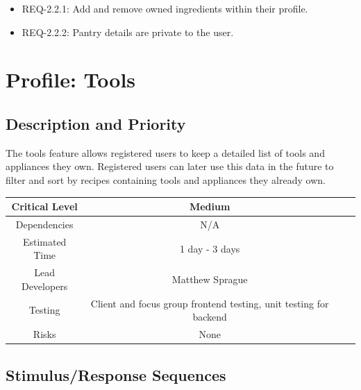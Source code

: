 \documentclass{scrreprt}
\begin{document}
\begin{itemize}
    \item REQ-2.2.1: Add and remove owned ingredients within their profile.
    \item REQ-2.2.2: Pantry details are private to the user.
\end{itemize}

\section{Profile: Tools}

\subsection{Description and Priority}

The tools feature allows registered users to keep a detailed list of tools and appliances they own. Registered users can later use this data in the future to filter and sort by recipes containing tools and appliances they already own.

\begin{center}
    \begin{tabular}{| c | c | c | c |}
        \hline
        Critical Level  & Medium                                                            \\
        \hline
        Dependencies    & N/A                                                               \\
        \hline
        Estimated Time  & 1 day - 3 days                                                    \\
        \hline
        Lead Developers & Matthew Sprague                                 \\
        \hline
        Testing         & Client and focus group \gls{frontend} testing,
                          \gls{unit testing} for \gls{backend}                              \\
        \hline
        Risks           & None                                                              \\
        \hline
    \end{tabular}
\end{center}

\subsection{Stimulus/Response Sequences}
\end{document}
